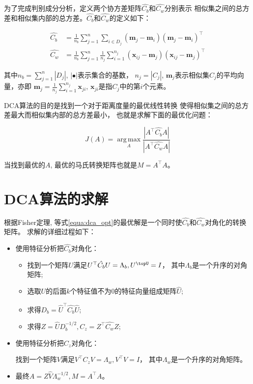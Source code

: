 为了完成判别成分分析，定义两个协方差矩阵$\hat{C_b}$和$\hat{C_w}$分别表示
相似集之间的总方差和相似集内部的总方差。$\hat{C_b}$和$\hat{C_w}$的定义如下：

\begin{align}
    \hat{C_b} &= \frac{1}{n_b} \sum_{j=1}^n \sum_{i \in D_j} (\bm{m}_j - \bm{m}_i)(\bm{m}_j - \bm{m}_i)^\top \\
    \hat{C_w} &= \frac{1}{n_b} \sum_{j=1}^n \frac{1}{n_j} \sum_{i = 1}^{n_j} (\bm{x}_{ij} - \bm{m}_j)(\bm{x}_{ij} - \bm{m}_j)^\top
\end{align}

其中$n_b = \sum_{j=1}^{n}|D_j|$, $|\bullet|$表示集合的基数，
$n_j = |C_j|$,
$\bm{m}_j$表示相似集$C_j$的平均向量，亦即
$\bm{m}_j = \frac{1}{n_j} \sum_{i=1}^{n_j} \bm{x}_{ji}$, 
$\bm{x}_{ji}$是指$C_j$中的第$i$个元素。

DCA算法的目的是找到一个对于距离度量的最优线性转换
使得相似集之间的总方差最大而相似集内部的总方差最小，
也就是求解下面的最优化问题：

$$
\begin{equation}
    \label{equa:dca_opt}
    J(A) = \operatorname*{arg\,max}_A \frac {|A^\top \hat{C_b} A|} {|A^\top \hat{C_w} A|}
\end{equation}
$$

当找到最优的$A$, 最优的马氏转换矩阵也就是$M = A^\top A$。

\section{DCA算法的求解}
\label{sec:algorithm_dca}

根据Fisher定理,
等式\ref{equa:dca_opt}的最优解是一个同时使$\hat{C_b}$和$\hat{C_w}$对角化的转换矩阵。
求解的详细过程如下：

\begin{itemize}
    \item 使用特征分析把$\hat{C_b}$对角化： 
        \begin{itemize}
            \item 找到一个矩阵$U$满足$U^\top\hat{C_b}U = \Lambda_b, U^\topU = I$，
                其中$\Lambda_b$是一个升序的对角矩阵;
            \item 选取$U$的后面$k$个特征值不为$0$的特征向量组成矩阵$\hat{U}$;
            \item 求得$D_b = \hat{U}^\top\hat{C_b}\hat{U}$;
            \item 求得$Z = \hat{U}D_b^{-1/2}, C_z = Z^\top\hat{C_w}Z$;
        \end{itemize}

    \item 使用特征分析把$C_z$对角化： 

        找到一个矩阵$V$满足$V^\top C_z V = \Lambda_w, V^\top V = I$，
                其中$\Lambda_w$是一个升序的对角矩阵。

    \item 最终$A = Z\hat{V}\Lambda_w^{-1/2}, M = A^\top A$。 
        
\end{itemize}
